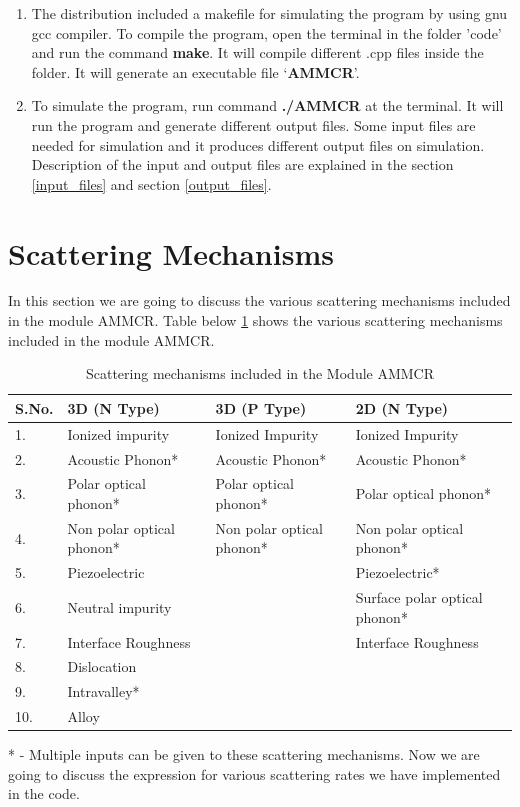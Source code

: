 \documentclass[12pt]{article}
\begin{document}
\begin{enumerate}
\item The distribution included a makefile for simulating the program by using gnu gcc compiler.  To compile the program, open the terminal in the folder 'code' and run the command \textbf{make}. It will compile different .cpp files inside the folder. It will generate an executable file \lq \textbf{AMMCR}\rq .

\item To simulate the program, run command \textbf{./AMMCR} at the terminal. It will run the program and generate different output files. Some input files are needed for simulation and it produces different output files on simulation. Description of the input and output files are explained in the section \ref{input_files} and section \ref{output_files}. 

\end{enumerate} 


\section{Scattering Mechanisms} \label{scattering}
In this section we are going to discuss the various scattering mechanisms included in the module AMMCR. 
Table below \ref{scattering} shows the various scattering mechanisms included in the module AMMCR.

\begin{table} [H]
\caption{ Scattering mechanisms included in the Module AMMCR}
\label{scattering_table}
\begin{tabular}{|l|l|l|l|}
\hline
S.No. & 3D (N Type) & 3D (P Type) & 2D (N Type)   \\
\hline                                      
1. & Ionized impurity   &  Ionized Impurity & Ionized Impurity \\
\hline
2. & Acoustic Phonon*   &  Acoustic Phonon* &  Acoustic Phonon*  \\
\hline
3. & Polar optical phonon*    &  Polar optical phonon* &  Polar optical phonon* \\
\hline
4. & Non polar optical phonon*   &  Non polar optical phonon*  &  Non polar optical phonon* \\
\hline
5. & Piezoelectric & & Piezoelectric* \\
\hline
6. & Neutral impurity & & Surface polar optical phonon* \\
\hline
7. & Interface Roughness & & Interface Roughness \\
\hline
8. & Dislocation & & \\
\hline
9. & Intravalley* & & \\
\hline
10. & Alloy & & \\
\hline
\end{tabular}
\end{table}
* - Multiple inputs can be given to these scattering mechanisms.
Now we are going to discuss the expression for various scattering rates we have implemented in the code.
\end{document}
